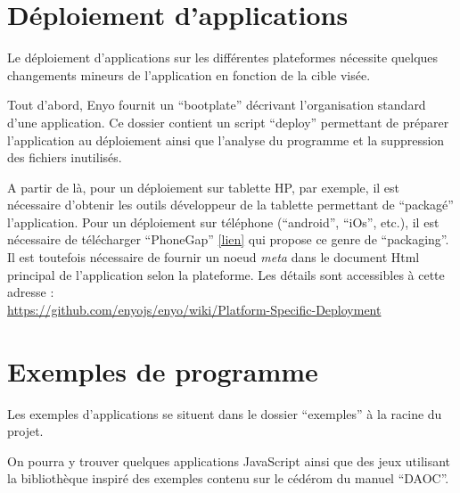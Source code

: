 \documentclass[11pt,a4paper]{report}
\begin{document}


\section{Déploiement d'applications}

Le déploiement d'applications sur les différentes plateformes nécessite quelques changements mineurs 
de l'application en fonction de la cible visée.

Tout d'abord, Enyo fournit un ``bootplate'' décrivant l'organisation standard d'une application.
Ce dossier contient un script ``deploy'' permettant de préparer l'application au 
déploiement ainsi que l'analyse du programme et la suppression des fichiers inutilisés.

A partir de là, pour un déploiement sur tablette HP, par exemple, il est nécessaire d'obtenir les outils
développeur de la tablette permettant de ``packagé'' l'application.
Pour un déploiement sur téléphone (``android'', ``iOs'', etc.), il est nécessaire de télécharger
``PhoneGap'' \href{http://www.phonegap.com/developer}{[lien]} qui propose ce genre de ``packaging''.
Il est toutefois nécessaire de fournir un noeud \emph{meta} dans le document Html principal de l'application
selon la plateforme.
Les détails sont accessibles à cette adresse : \\
\url{https://github.com/enyojs/enyo/wiki/Platform-Specific-Deployment}

\section{Exemples de programme}

Les exemples d'applications se situent dans le dossier ``exemples'' à la racine du projet.

On pourra y trouver quelques applications JavaScript ainsi que des jeux utilisant la bibliothèque inspiré des exemples contenu sur le cédérom 
du manuel ``DAOC''\cite{DAOC}.

\tableofcontents
\nocite{*}


\end{document}
